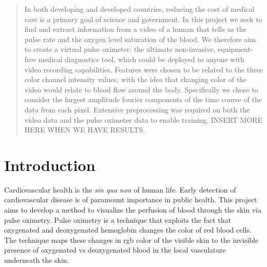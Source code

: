 \documentclass[a0,landscape]{a0poster}
\begin{document}
\vspace{1cm} %


\begin{multicols}{4} %


\color{Navy} %

\begin{abstract}

In both developing and developed countries, reducing the cost of medical care is a primary goal of science and government.
 In this project we seek to find and extract information from a video of a human that tells us the pulse rate and the oxygen level saturation of the blood. 
 We therefore aim to create a virtual pulse oximeter: the ultimate non-invasive, equipment-free medical diagnostics tool, which could be deployed to anyone with video recording capabilities.
 Features were chosen to be related to the three color channel intensity values, with the idea that changing color of the video would relate to blood flow around the body.
 Specifically we chose to consider the largest amplitude fourier components of the time course of the data from each pixel.
 Extensive preprocessing was required on both the video data and the pulse oximeter data to enable training.
 INSERT MORE HERE WHEN WE HAVE RESULTS.
\end{abstract}

\color{SaddleBrown} %

\section*{Introduction}

Cardiovascular health is the \emph{sin qua non} of human life. Early detection of cardiovascular disease is of paramount importance in public health. This project aims to develop a method to visualize the perfusion of blood through the skin via pulse oximetry. Pulse oximetry is a technique that exploits the fact that oxygenated and deoxygenated hemoglobin changes the color of red blood cells. The technique maps these changes in rgb color of the visible skin to the invisible presence of oxygenated vs deoxygenated blood in the local vasculature underneath the skin.


\end{multicols}
\end{document}
